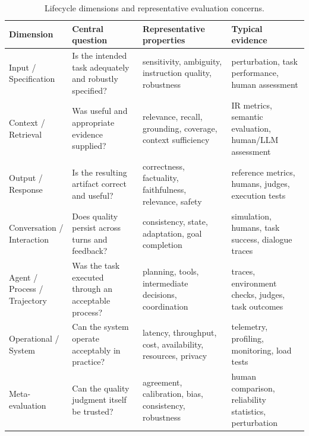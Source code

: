 \begin{table}[t]
\caption{Lifecycle dimensions and representative evaluation concerns.}
\label{tab:quality-dimensions}
\begin{tabular}{p{} p{} p{} p{}}
\toprule
\textbf{Dimension} & \textbf{Central question} & \textbf{Representative properties} & \textbf{Typical evidence} \\
\midrule
Input / Specification & Is the intended task adequately and robustly specified? & sensitivity, ambiguity, instruction quality, robustness & perturbation, task performance, human assessment \\
Context / Retrieval & Was useful and appropriate evidence supplied? & relevance, recall, grounding, coverage, context sufficiency & IR metrics, semantic evaluation, human/LLM assessment \\
Output / Response & Is the resulting artifact correct and useful? & correctness, factuality, faithfulness, relevance, safety & reference metrics, humans, judges, execution tests \\
Conversation / Interaction & Does quality persist across turns and feedback? & consistency, state, adaptation, goal completion & simulation, humans, task success, dialogue traces \\
Agent / Process / Trajectory & Was the task executed through an acceptable process? & planning, tools, intermediate decisions, coordination & traces, environment checks, judges, task outcomes \\
Operational / System & Can the system operate acceptably in practice? & latency, throughput, cost, availability, resources, privacy & telemetry, profiling, monitoring, load tests \\
Meta-evaluation & Can the quality judgment itself be trusted? & agreement, calibration, bias, consistency, robustness & human comparison, reliability statistics, perturbation \\
\bottomrule
\end{tabular}
\end{table}
